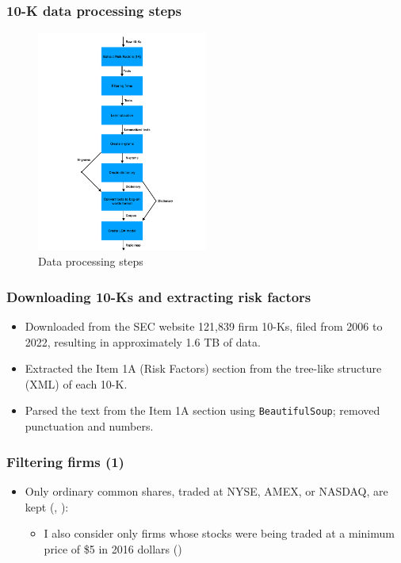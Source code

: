 \documentclass{beamer}
\begin{document}
\begin{frame}
\frametitle{10-K data processing steps}
\begin{figure}[h!]
  \centering
  \includegraphics[width=0.5\textwidth]{data_steps.pdf}
  \caption{Data processing steps}
  \label{data_steps}
\end{figure}
\end{frame}

\begin{frame}
\frametitle{Downloading 10-Ks and extracting risk factors}
\begin{itemize}
\item Downloaded from the SEC website 121,839 firm 10-Ks, filed from 2006 to 2022, resulting in approximately 1.6 TB of data. 
\item Extracted the Item 1A (Risk Factors) section from the tree-like structure (XML) of each 10-K.
\item Parsed the text from the Item 1A section using \texttt{BeautifulSoup}; removed punctuation and numbers.
\end{itemize}
\end{frame}


\begin{frame}
\frametitle{Filtering firms (1)}
\begin{itemize}
\item Only ordinary common shares, traded at NYSE, AMEX, or NASDAQ, are kept (\cite{Stambaugh2016-eb}, \cite{Golubov2019-ku}):
\begin{itemize}
  \item I also consider only firms whose stocks were being traded at a minimum price of \$5 in 2016 dollars (\cite{Stambaugh2016-eb})
\end{itemize}
\end{itemize}
\end{frame}
\end{document}
